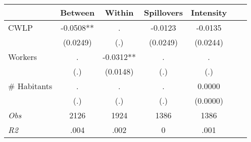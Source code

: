 \begin{tabular}{l*{6}{c}}\hline&\multicolumn{1}{c}{Between}&\multicolumn{1}{c}{Within}&\multicolumn{1}{c}{Spillovers}&\multicolumn{1}{c}{Intensity}\\ \hline 
CWLP & -0.0508** & . & -0.0123 & -0.0135 \\
 & (0.0249) & (.) & (0.0249) & (0.0244) \\
Workers & . & -0.0312** & . & . \\
 & (.) & (0.0148) & (.) & (.) \\
\# Habitants & . & . & . & 0.0000 \\
  & (.) & (.) & (.) & (0.0000) \\
\hline \textit{Obs} & 2126 & 1924 & 1386 & 1386  \\ \textit{R2} & .004 & .002 & 0 & .001 \\ \hline \end{tabular}
